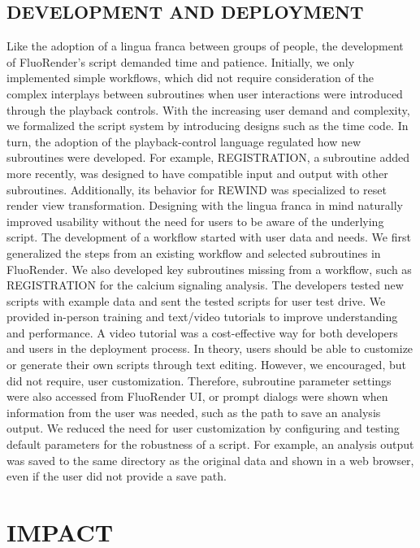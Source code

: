 \documentclass{IEEEcsmag}
\begin{document}
\subsection{DEVELOPMENT AND DEPLOYMENT}

Like the adoption of a lingua franca between groups of people, the development of FluoRender’s script demanded time and patience. Initially, we only implemented simple workflows, which did not require consideration of the complex interplays between subroutines when user interactions were introduced through the playback controls. With the increasing user demand and complexity, we formalized the script system by introducing designs such as the time code. In turn, the adoption of the playback-control language regulated how new subroutines were developed. For example, REGISTRATION, a subroutine added more recently, was designed to have compatible input and output with other subroutines. Additionally, its behavior for REWIND was specialized to reset render view transformation. Designing with the lingua franca in mind naturally improved usability without the need for users to be aware of the underlying script.
The development of a workflow started with user data and needs. We first generalized the steps from an existing workflow and selected subroutines in FluoRender. We also developed key subroutines missing from a workflow, such as REGISTRATION for the calcium signaling analysis. The developers tested new scripts with example data and sent the tested scripts for user test drive. We provided in-person training and text/video tutorials to improve understanding and performance. A video tutorial was a cost-effective way for both developers and users in the deployment process. In theory, users should be able to customize or generate their own scripts through text editing. However, we encouraged, but did not require, user customization. Therefore, subroutine parameter settings were also accessed from FluoRender UI, or prompt dialogs were shown when information from the user was needed, such as the path to save an analysis output. We reduced the need for user customization by configuring and testing default parameters for the robustness of a script. For example, an analysis output was saved to the same directory as the original data and shown in a web browser, even if the user did not provide a save path.

\section{IMPACT}
\end{document}
